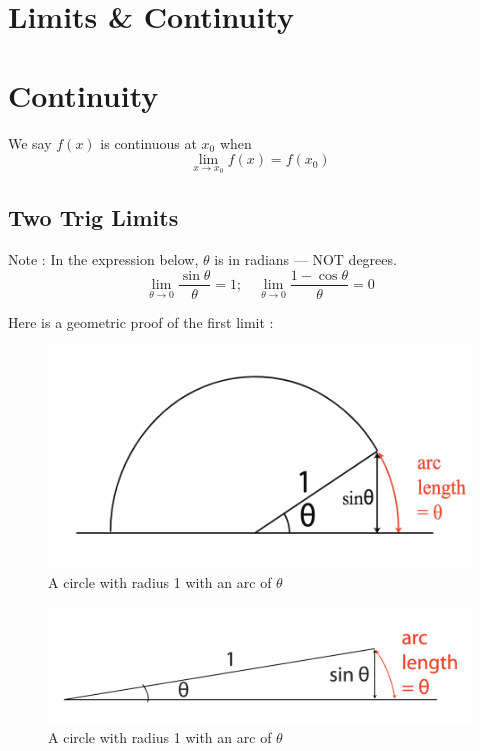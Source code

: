 

\section*{\centering Limits \& Continuity}

\bigbreak
\section{Continuity}

We say $f(x)$ is continuous at $x_0$ when $$\lim_{x \to x_0} f(x) = f(x_0)$$

\subsection*{Two Trig Limits}

Note : In the expression below, $\theta$ is in radians --- NOT degrees.
$$ \boxed{	\lim_{\theta \to 0} \frac{\sin \theta}{\theta} = 1; \quad \lim_{\theta \to 0} \frac{1-\cos \theta}{\theta} = 0 } $$

Here is a geometric proof of the first limit : 

\begin{figure}[h]
	\centering
	\includegraphics[scale=0.7]{./images/lecture_2_figure_1.png}
	\caption{A circle with radius 1 with an arc of $\theta$}    
\end{figure}

\begin{figure}[h]
	\centering
	\includegraphics[scale=0.5]{./images/lecture_2_figure_2.png}
	\caption{A circle with radius 1 with an arc of $\theta$}    
\end{figure}

